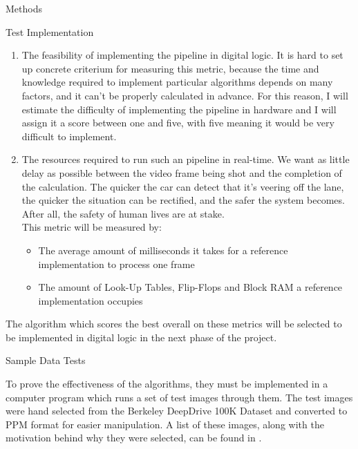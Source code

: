 \documentclass{matthijs}
\begin{document}
\begin{hoofdstuk}{Methods}
\begin{paragraaf}{Test Implementation}
\begin{enumerate}
				\item	The feasibility of implementing the pipeline in digital logic.
					It is hard to set up concrete criterium for measuring this metric, because the time and knowledge required to implement particular algorithms depends on many factors, and it can't be properly calculated in advance.
					For this reason, I will estimate the difficulty of implementing the pipeline in hardware and I will assign it a score between one and five, with five meaning it would be very difficult to implement.

				\item	The resources required to run such an pipeline in real-time.
					We want as little delay as possible between the video frame being shot and the completion of the calculation.
					The quicker the car can detect that it's veering off the lane, the quicker the situation can be rectified, and the safer the system becomes.
					After all, the safety of human lives are at stake.\\
					This metric will be measured by:

					\begin{itemize}

						\item	The average amount of milliseconds it takes for a reference implementation to process one frame
						
						\item	The amount of Look-Up Tables, Flip-Flops and Block RAM a reference implementation occupies

					\end{itemize}

			\end{enumerate}

			The algorithm which scores the best overall on these metrics will be selected to be implemented in digital logic in the next phase of the project.
		\end{paragraaf}

		\begin{paragraaf}{Sample Data Tests}

			To prove the effectiveness of the algorithms, they must be implemented in a computer program which runs a set of test images through them.
			The test images were hand selected from the Berkeley DeepDrive 100K Dataset \cite{yu2020bdd100k} and converted to PPM format for easier manipulation.
			A list of these images, along with the motivation behind why they were selected, can be found in .


\end{paragraaf}
\end{hoofdstuk}
\end{document}
